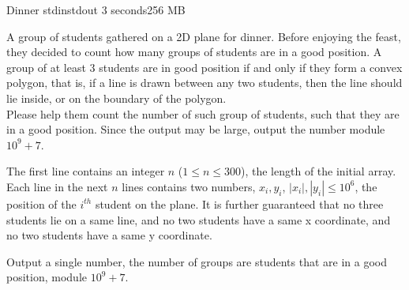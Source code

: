\begin{problem}{Dinner}
{stdin}{stdout}
{3 seconds}{256 MB}{}

A group of students gathered on a 2D plane for dinner. Before enjoying the feast, they decided to count how many groups of students are in a good position. A group of at least 3 students are in good position if and only if they form a convex polygon, that is, if a line is drawn between any two students, then the line should lie inside, or on the boundary of the polygon. \\
Please help them count the number of such group of students, such that they are in a good position. Since the output may be large, output the number module $10^9 + 7$.

\InputFile
The first line contains an integer $n$ ($1 \leq n \leq 300$), the length of the initial array. Each line in the next $n$ lines contains two numbers, $x_i, y_i$, $|x_i|, |y_i| \leq 10^6$, the position of the $i^{th}$ student on the plane. It is further guaranteed that no three students lie on a same line, and no two students have a same x coordinate, and no two students have a same y coordinate.

\OutputFile

Output a single number, the number of groups are students that are in a good position, module $10^9 + 7$.

\Examples

\begin{example}
%
\end{example}

\begin{example}
%
\end{example}

\begin{example}
%
\end{example}

\end{problem}

